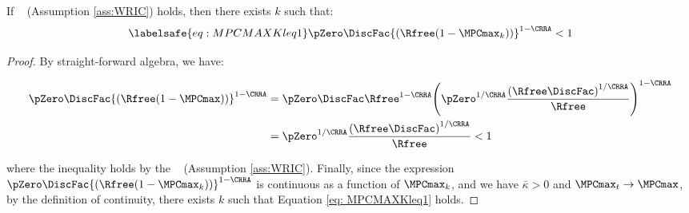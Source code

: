 \documentclass[\econtexRoot/BufferStockTheory]{subfiles}
\begin{document}
\begin{claim}
If \WRIC~ (Assumption \ref{ass:WRIC}) holds, then there exists $k$ such that:
%
%
\begin{equation}\labelsafe{eq: MPCMAXKleq1}
  \pZero \DiscFac {(\Rfree (1-\MPCmax_{k}))}^{1-\CRRA}   < 1
\end{equation}
%
\end{claim}
\begin{proof}

By straight-forward algebra, we have:

\begin{align}
\pZero \DiscFac {(\Rfree (1-\MPCmax))}^{1-\CRRA}  & = \pZero\DiscFac\Rfree^{1-\CRRA}{\left(\pZero^{1/\CRRA}\frac{{(\Rfree\DiscFac)}^{1/\CRRA}}{\Rfree}\right)}^{1-\CRRA} \\\notag
& = \pZero^{1/\CRRA}\frac{{(\Rfree\DiscFac)}^{1/\CRRA}}{\Rfree} <1 \notag
\end{align}

where the inequality holds by the \WRIC ~ (Assumption \ref{ass:WRIC}).
Finally, since the expression $\pZero \DiscFac {(\Rfree (1-\MPCmax_{k}))}^{1-\CRRA} $ is continuous as a function of $\MPCmax_{k}$, and we have $\bar{\kappa}>0$ and $\MPCmax_{t} \rightarrow \MPCmax$, by the definition of continuity, there exists $k$ such that Equation \eqref{eq: MPCMAXKleq1} holds.

\end{proof}
\end{document}

